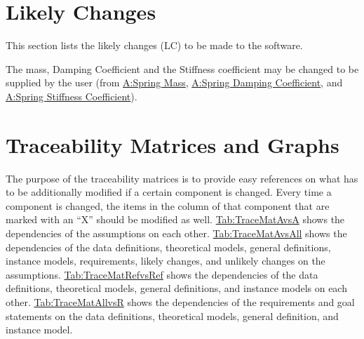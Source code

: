 \documentclass[12pt]{article}
\begin{document}
\section{Likely Changes}
\label{Sec:LCs}
This section lists the likely changes (LC) to be made to the software.

\begin{description}[font=\normalfont]
\item[DC Gain and Time Constant:\phantomsection\label{likeChgPP}]{The mass, Damping Coefficient and the Stiffness coefficient may be changed to be supplied by the user (from \hyperref[massSpring]{A:Spring Mass}, \hyperref[dampingCoeffSpring]{A:Spring Damping Coefficient}, and \hyperref[stiffnessCoeffSpring]{A:Spring Stiffness Coefficient}).}
\end{description}
\section{Traceability Matrices and Graphs}
\label{Sec:TraceMatrices}
The purpose of the traceability matrices is to provide easy references on what has to be additionally modified if a certain component is changed. Every time a component is changed, the items in the column of that component that are marked with an ``X'' should be modified as well. \hyperref[Table:TraceMatAvsA]{Tab:TraceMatAvsA} shows the dependencies of the assumptions on each other. \hyperref[Table:TraceMatAvsAll]{Tab:TraceMatAvsAll} shows the dependencies of the data definitions, theoretical models, general definitions, instance models, requirements, likely changes, and unlikely changes on the assumptions. \hyperref[Table:TraceMatRefvsRef]{Tab:TraceMatRefvsRef} shows the dependencies of the data definitions, theoretical models, general definitions, and instance models on each other. \hyperref[Table:TraceMatAllvsR]{Tab:TraceMatAllvsR} shows the dependencies of the requirements and goal statements on the data definitions, theoretical models, general definition, and instance model.
\end{document}
